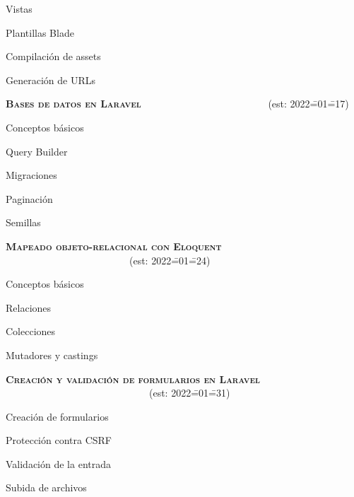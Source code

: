 \begin{longenum}
    \begin{longenum}
        \item Vistas
        \item Plantillas Blade
        \item Compilación de assets
        \item Generación de URLs
    \end{longenum}
    \item \textbf{\textsc{Bases de datos en Laravel}} \ \ \ \ \ \ \ \ \ \ \ \ \ \ \ \ \ \ \ \ \ \ \ \ \ (est: 2022\==01\==17)
    \begin{longenum}
        \item Conceptos básicos
        \item Query Builder
        \item Migraciones
        \item Paginación
        \item Semillas
    \end{longenum}
    \item \textbf{\textsc{Mapeado objeto-relacional con Eloquent}} \ \ \ \ \ \ \ \ \ \ \ \ \ \ \ \ \ \ \ \ \ \ \ \ \ (est: 2022\==01\==24)
    \begin{longenum}
        \item Conceptos básicos
        \item Relaciones
        \item Colecciones
        \item Mutadores y castings
    \end{longenum}
    \item \textbf{\textsc{Creación y validación de formularios en Laravel}} \ \ \ \ \ \ \ \ \ \ \ \ \ \ \ \ \ \ \ \ \ \ \ \ \ \ \ \ \ (est: 2022\==01\==31)
    \begin{longenum}
        \item Creación de formularios
        \item Protección contra CSRF
        \item Validación de la entrada
        \item Subida de archivos

\end{longenum}
\end{longenum}
